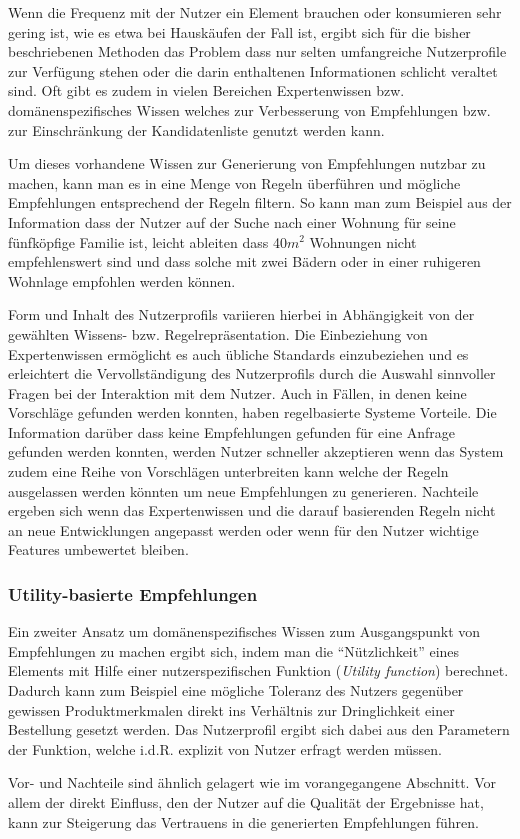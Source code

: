 Wenn die Frequenz mit der Nutzer ein Element brauchen oder konsumieren sehr gering ist, wie es etwa bei Hauskäufen der Fall ist, ergibt sich für die bisher beschriebenen Methoden das Problem dass nur selten umfangreiche Nutzerprofile zur Verfügung stehen oder die darin enthaltenen Informationen schlicht veraltet sind. Oft gibt es zudem in vielen Bereichen Expertenwissen bzw. domänenspezifisches Wissen welches zur Verbesserung von Empfehlungen bzw. zur Einschränkung der Kandidatenliste genutzt werden kann.

Um dieses vorhandene Wissen zur Generierung von Empfehlungen nutzbar zu machen, kann man es in eine Menge von Regeln überführen und mögliche Empfehlungen entsprechend der Regeln filtern. So kann man zum Beispiel aus der Information dass der Nutzer auf der Suche nach einer Wohnung für seine fünfköpfige Familie ist, leicht ableiten dass 40$m^{2}$ Wohnungen nicht empfehlenswert sind und dass solche mit zwei Bädern oder in einer ruhigeren Wohnlage empfohlen werden können.

Form und Inhalt des Nutzerprofils variieren hierbei in Abhängigkeit von der gewählten Wissens- bzw. Regelrepräsentation. Die Einbeziehung von Expertenwissen ermöglicht es auch übliche Standards einzubeziehen und es erleichtert die Vervollständigung des Nutzerprofils durch die Auswahl sinnvoller Fragen bei der Interaktion mit dem Nutzer. Auch in Fällen, in denen keine Vorschläge gefunden werden konnten, haben regelbasierte Systeme Vorteile. Die Information darüber dass keine Empfehlungen gefunden für eine Anfrage gefunden werden konnten, werden Nutzer schneller akzeptieren wenn das System zudem eine Reihe von Vorschlägen unterbreiten kann welche der Regeln ausgelassen werden könnten um neue Empfehlungen zu generieren. Nachteile ergeben sich wenn das Expertenwissen und die darauf basierenden Regeln nicht an neue Entwicklungen angepasst werden oder wenn für den Nutzer wichtige Features umbewertet bleiben. \citep[Kap. 4]{rs}

\subsubsection{Utility-basierte Empfehlungen}

Ein zweiter Ansatz um domänenspezifisches Wissen zum Ausgangspunkt von Empfehlungen zu machen ergibt sich, indem man die ``Nützlichkeit'' eines Elements mit Hilfe einer nutzerspezifischen Funktion (\textit{Utility function}) berechnet. Dadurch kann zum Beispiel eine mögliche Toleranz des Nutzers gegenüber gewissen Produktmerkmalen direkt ins Verhältnis zur Dringlichkeit einer Bestellung gesetzt werden. Das Nutzerprofil ergibt sich dabei aus den Parametern der Funktion, welche i.d.R. explizit von Nutzer erfragt werden müssen.

Vor- und Nachteile sind ähnlich gelagert wie im vorangegangene Abschnitt. Vor allem der direkt Einfluss, den der Nutzer auf die Qualität der Ergebnisse hat, kann zur Steigerung das Vertrauens in die generierten Empfehlungen führen.  \citep[Kap. 1]{hb} \citep{Burke:2002:HRS:586321.586352, hb_20}





